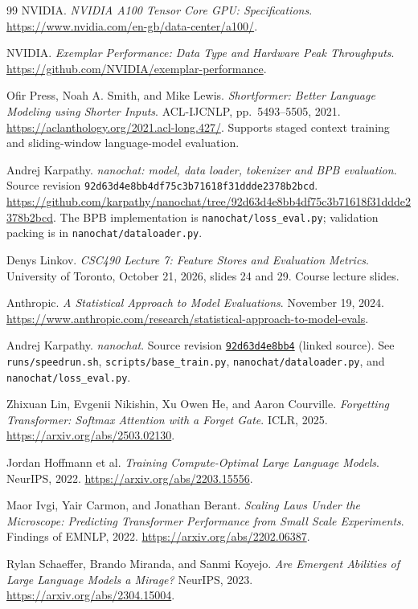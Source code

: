 \documentclass[11pt]{article}
\begin{document}
\begin{thebibliography}{99}
NVIDIA. \emph{NVIDIA A100 Tensor Core GPU: Specifications}.
\url{https://www.nvidia.com/en-gb/data-center/a100/}.

NVIDIA. \emph{Exemplar Performance: Data Type and Hardware Peak Throughputs}.
\url{https://github.com/NVIDIA/exemplar-performance}.

% 

Ofir Press, Noah A. Smith, and Mike Lewis.
\emph{Shortformer: Better Language Modeling using Shorter Inputs}.
ACL-IJCNLP, pp.~5493--5505, 2021.
\url{https://aclanthology.org/2021.acl-long.427/}.
Supports staged context training and sliding-window language-model evaluation.

Andrej Karpathy. \emph{nanochat: model, data loader, tokenizer and BPB evaluation}.
Source revision \texttt{92d63d4e8bb4df75c3b71618f31ddde2378b2bcd}.
\url{https://github.com/karpathy/nanochat/tree/92d63d4e8bb4df75c3b71618f31ddde2378b2bcd}.
The BPB implementation is \texttt{nanochat/loss\_eval.py}; validation packing
is in \texttt{nanochat/dataloader.py}.

Denys Linkov. \emph{CSC490 Lecture 7: Feature Stores and Evaluation Metrics}.
University of Toronto, October 21, 2026, slides 24 and 29.
Course lecture slides.

Anthropic. \emph{A Statistical Approach to Model Evaluations}.
November 19, 2024.
\url{https://www.anthropic.com/research/statistical-approach-to-model-evals}.

Andrej Karpathy. \emph{nanochat}.
Source revision \href{https://github.com/karpathy/nanochat/tree/92d63d4e8bb4df75c3b71618f31ddde2378b2bcd}{\texttt{92d63d4e8bb4}} (linked source).
See \texttt{runs/speedrun.sh}, \texttt{scripts/base\_train.py},
\texttt{nanochat/dataloader.py}, and \texttt{nanochat/loss\_eval.py}.

Zhixuan Lin, Evgenii Nikishin, Xu Owen He, and Aaron Courville.
\emph{Forgetting Transformer: Softmax Attention with a Forget Gate}.
ICLR, 2025. \url{https://arxiv.org/abs/2503.02130}.

Jordan Hoffmann et al. \emph{Training Compute-Optimal Large Language Models}.
NeurIPS, 2022. \url{https://arxiv.org/abs/2203.15556}.

Maor Ivgi, Yair Carmon, and Jonathan Berant.
\emph{Scaling Laws Under the Microscope: Predicting Transformer Performance
from Small Scale Experiments}.
Findings of EMNLP, 2022. \url{https://arxiv.org/abs/2202.06387}.

Rylan Schaeffer, Brando Miranda, and Sanmi Koyejo.
\emph{Are Emergent Abilities of Large Language Models a Mirage?}
NeurIPS, 2023. \url{https://arxiv.org/abs/2304.15004}.

\end{thebibliography}
\end{document}
